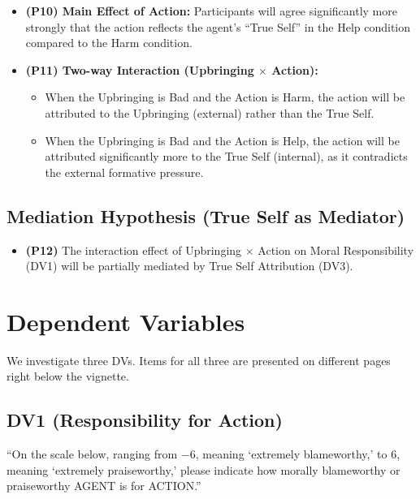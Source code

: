 \documentclass[scrarticle]{scrartcl}
\begin{document}
\begin{itemize}
   \item[--] \textsf{\textbf{(P10) Main Effect of Action:}} Participants will agree significantly more strongly that the action reflects the agent's \enquote{True Self} in the Help condition compared to the Harm condition.
   \item[--] \textsf{\textbf{(P11) Two-way Interaction (Upbringing $\times$ Action):}}
   \begin{itemize}
      \item[--] When the Upbringing is Bad and the Action is Harm, the action will be attributed to the Upbringing (external) rather than the True Self.
      \item[--] When the Upbringing is Bad and the Action is Help, the action will be attributed significantly more to the True Self (internal), as it contradicts the external formative pressure.
   \end{itemize}
\end{itemize}


\subsection*{Mediation Hypothesis (True Self as Mediator)}
\begin{itemize}
   \item[--] \textsf{\textbf{(P12)}} The interaction effect of Upbringing $\times$ Action on Moral Responsibility (DV1) will be partially mediated by True Self Attribution (DV3).
\end{itemize}


\section{Dependent Variables}
We investigate three DVs.
Items for all three are presented on different pages right below the vignette.


\subsection*{DV1 (Responsibility for Action)}
\enquote{On the scale below, ranging from $-6$, meaning \enquote{extremely blameworthy,} to $6$, meaning \enquote{extremely praiseworthy,} please indicate how morally blameworthy or praiseworthy AGENT is for ACTION.}
\end{document}
